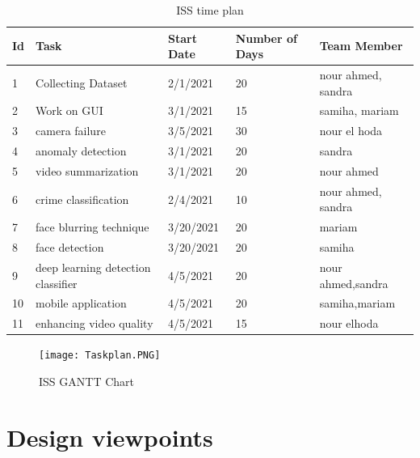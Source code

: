 \documentclass[12pt]{article}
\begin{document}
\begin{table}[htbp]
\centering
\caption{ISS time plan}
\label{tab:Time Plan}


\begin{tabular}{|l|l|l|l|l|}
\hline
Id & Task               & Start Date & Number of Days & Team Member \\ \hline
1  & Collecting Dataset    & 2/1/2021 & 20           & nour ahmed, sandra        \\ \hline
2  & Work on GUI        & 3/1/2021 & 15             & samiha, mariam        \\ \hline
3  & camera failure    & 3/5/2021 & 30              & nour el hoda          \\ \hline
4  &  anomaly detection & 3/1/2021 &20             & sandra    \\ \hline
5  & video summarization     & 3/1/2021 & 20             & nour ahmed           \\ \hline

6 & crime classification     & 2/4/2021 & 10    & nour ahmed, sandra          \\ \hline
7 &   face blurring technique  & 3/20/2021 & 20             & mariam     \\ \hline
8 &   face detection    & 3/20/2021 & 20             & samiha    \\ \hline
9 &  deep learning detection classifier    & 4/5/2021 & 20             & nour ahmed,sandra    \\ \hline
10 & mobile application    & 4/5/2021 & 20             & samiha,mariam    \\ \hline
11 & enhancing video quality   & 4/5/2021 & 15             & nour elhoda          \\ \hline

\hline
\end{tabular}
\end{table}

\begin{figure}[htbp]
\centering
\texttt{[image: Taskplan.PNG]}
\caption{ISS GANTT Chart}
\label{fig:GANTT Chart}
\end{figure}

\clearpage
\section{Design viewpoints} 
\end{document}

